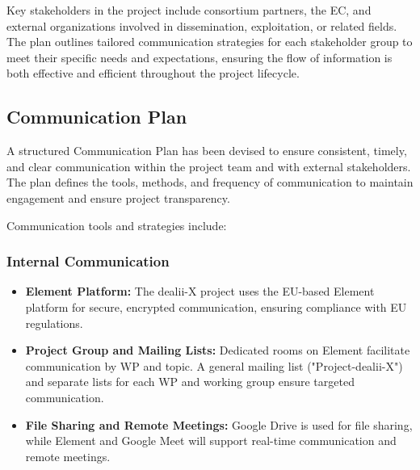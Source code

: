 \documentclass[a4paper,12pt]{article}
\begin{document}
Key stakeholders in the project include consortium partners, the EC, and external organizations involved in dissemination, exploitation, or related fields. The plan outlines tailored communication strategies for each stakeholder group to meet their specific needs and expectations, ensuring the flow of information is both effective and efficient throughout the project lifecycle.





\subsection{\textcolor{EUblue}{Communication Plan}} A structured Communication Plan has been devised to ensure consistent, timely, and clear communication within the project team and with external stakeholders. The plan defines the tools, methods, and frequency of communication to maintain engagement and ensure project transparency.

Communication tools and strategies include:

\subsubsection*{\textbf{Internal Communication}}

\begin{itemize}[left=2em, itemsep=1pt, topsep=0pt] 
    \item \textbf{Element Platform:} The dealii-X project uses the EU-based Element platform for secure, encrypted communication, ensuring compliance with EU regulations. 
    \item \textbf{Project Group and Mailing Lists:} Dedicated rooms on Element facilitate communication by WP and topic. A general mailing list ("Project-dealii-X") and separate lists for each WP and working group ensure targeted communication. 
    \item \textbf{File Sharing and Remote Meetings:} Google Drive is used for file sharing, while Element and Google Meet will support real-time communication and remote meetings. \end{itemize}
\end{document}
